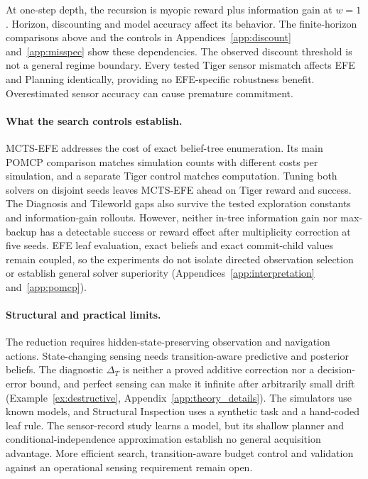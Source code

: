 \documentclass[runningheads]{llncs}
\begin{document}
At one-step depth, the recursion is myopic reward plus information gain at $w=1$. Horizon, discounting and model accuracy affect its behavior. The finite-horizon comparisons above and the controls in Appendices~\ref{app:discount} and~\ref{app:misspec} show these dependencies. The observed discount threshold is not a general regime boundary. Every tested Tiger sensor mismatch affects EFE and Planning identically, providing no EFE-specific robustness benefit. Overestimated sensor accuracy can cause premature commitment.

\paragraph{What the search controls establish.}
MCTS-EFE addresses the cost of exact belief-tree enumeration. Its main POMCP comparison matches simulation counts with different costs per simulation, and a separate Tiger control matches computation. Tuning both solvers on disjoint seeds leaves MCTS-EFE ahead on Tiger reward and success. The Diagnosis and Tileworld gaps also survive the tested exploration constants and information-gain rollouts. However, neither in-tree information gain nor max-backup has a detectable success or reward effect after multiplicity correction at five seeds. EFE leaf evaluation, exact beliefs and exact commit-child values remain coupled, so the experiments do not isolate directed observation selection or establish general solver superiority (Appendices~\ref{app:interpretation} and~\ref{app:pomcp}).

\paragraph{Structural and practical limits.}
The reduction requires hidden-state-preserving observation and navigation actions. State-changing sensing needs transition-aware predictive and posterior beliefs. The diagnostic $\Delta_T$ is neither a proved additive correction nor a decision-error bound, and perfect sensing can make it infinite after arbitrarily small drift (Example~\ref{ex:destructive}, Appendix~\ref{app:theory_details}). The simulators use known models, and Structural Inspection uses a synthetic task and a hand-coded leaf rule. The sensor-record study learns a model, but its shallow planner and conditional-independence approximation establish no general acquisition advantage. More efficient search, transition-aware budget control and validation against an operational sensing requirement remain open.
\end{document}
